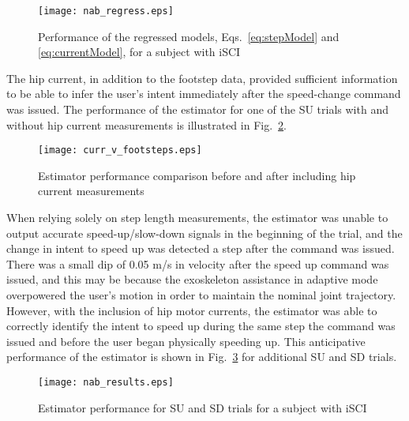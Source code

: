 \begin{figure}
	\centering
	\texttt{[image: nab\_regress.eps]}
	\vspace{-1em}
	\caption{Performance of the regressed models, Eqs.~\eqref{eq:stepModel} and \eqref{eq:currentModel}, for a subject with iSCI} \label{fig:nab_regressor}
\end{figure}


The hip current, in addition to the footstep data, provided sufficient information to be able to infer the user's intent immediately after the speed-change command was issued. The performance of the estimator for one of the SU trials with and without hip current measurements is illustrated in Fig.~\ref{fig:c_v_f}. 

\begin{figure}
	\centering
	\texttt{[image: curr\_v\_footsteps.eps]}
	\vspace{-1em}
	\caption{Estimator performance comparison before and after including hip current measurements} \label{fig:c_v_f}
\end{figure}

When relying solely on step length measurements, the estimator was unable to output accurate speed-up/slow-down signals in the beginning of the trial, and the change in intent to speed up was detected a step after the command was issued. There was a small dip of 0.05 m/s in velocity after the speed up command was issued, and this may be because the exoskeleton assistance in adaptive mode overpowered the user's motion in order to maintain the nominal joint trajectory. However, with the inclusion of hip motor currents, the estimator was able to correctly identify the intent to speed up during the same step the command was issued and before the user began physically speeding up. This anticipative performance of the estimator is shown in Fig.~\ref{fig:nab_results} for additional SU and SD trials.
 
\begin{figure}
	\centering
	\texttt{[image: nab\_results.eps]}
	\caption{Estimator performance for SU and SD trials for a subject with iSCI} \label{fig:nab_results}
	\vspace{-1em}
\end{figure}

